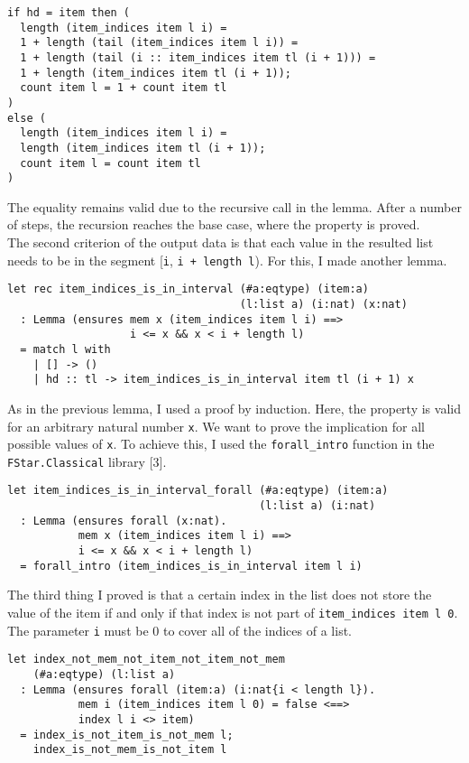 \begin{verbatim}
if hd = item then ( 
  length (item_indices item l i) = 
  1 + length (tail (item_indices item l i)) = 
  1 + length (tail (i :: item_indices item tl (i + 1))) = 
  1 + length (item_indices item tl (i + 1)); 
  count item l = 1 + count item tl 
) 
else ( 
  length (item_indices item l i) = 
  length (item_indices item tl (i + 1)); 
  count item l = count item tl 
)
\end{verbatim}

The equality remains valid due to the recursive call in the lemma. After a number of steps, the recursion reaches the base case, where the property is proved. \\
\indent The second criterion of the output data is that each value in the resulted list needs to be in the segment [\texttt{i}, \texttt{i + length l}). For this, I made another lemma. 

\begin{verbatim}
let rec item_indices_is_in_interval (#a:eqtype) (item:a) 
                                    (l:list a) (i:nat) (x:nat) 
  : Lemma (ensures mem x (item_indices item l i) ==> 
                   i <= x && x < i + length l) 
  = match l with 
    | [] -> () 
    | hd :: tl -> item_indices_is_in_interval item tl (i + 1) x
\end{verbatim}

As in the previous lemma, I used a proof by induction. Here, the property is valid for an arbitrary natural number \texttt{x}. We want to prove the implication for all possible values of \texttt{x}. To achieve this, I used the \texttt{forall\_intro} function in the \texttt{FStar.Classical} library [\(3\)].

\begin{verbatim}
let item_indices_is_in_interval_forall (#a:eqtype) (item:a) 
                                       (l:list a) (i:nat)
  : Lemma (ensures forall (x:nat). 
           mem x (item_indices item l i) ==> 
           i <= x && x < i + length l) 
  = forall_intro (item_indices_is_in_interval item l i)
\end{verbatim}

The third thing I proved is that a certain index in the list does not store the value of the item if and only if that index is not part of \texttt{item\_indices item l 0}. The parameter \texttt{i} must be \(0\) to cover all of the indices of a list.

\begin{verbatim}
let index_not_mem_not_item_not_item_not_mem 
    (#a:eqtype) (l:list a)
  : Lemma (ensures forall (item:a) (i:nat{i < length l}).
           mem i (item_indices item l 0) = false <==>
           index l i <> item)
  = index_is_not_item_is_not_mem l;
    index_is_not_mem_is_not_item l
\end{verbatim}

